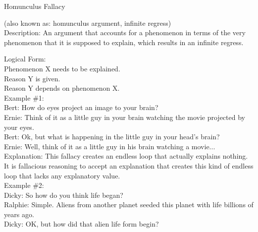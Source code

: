 \documentclass[a4paper,12pt,single,pdftex]{scrartcl}
\begin{document}
Homunculus Fallacy
    
      (also known as: homunculus argument, infinite regress)
    \\

  
    Description: An argument that accounts for a phenomenon in terms of the very phenomenon that it is supposed to explain, which results in an infinite regress.

    
      Logical Form:
    \\

    
      Phenomenon X needs to be explained.
    \\

    
      Reason Y is given.
    \\

    
      Reason Y depends on phenomenon X.
    \\

    
      Example \#1:
    \\

    
      Bert: How do eyes project an image to your brain?
    \\

    
      Ernie: Think of it as a little guy in your brain watching the movie projected by your eyes.
    \\

    
      Bert: Ok, but what is happening in the little guy in your head’s brain?
    \\

    
      Ernie: Well, think of it as a little guy in his brain watching a movie...
    \\

    
      Explanation: This fallacy creates an endless loop that actually explains nothing.  It is fallacious reasoning to accept an explanation that creates this kind of endless loop that lacks any explanatory value.
    \\

    
      Example \#2:
    \\

    
      Dicky: So how do you think life began?
    \\

    
      Ralphie: Simple.  Aliens from another planet seeded this planet with life billions of years ago.
    \\

    
      Dicky: OK, but how did that alien life form begin?
    \\
\end{document}
